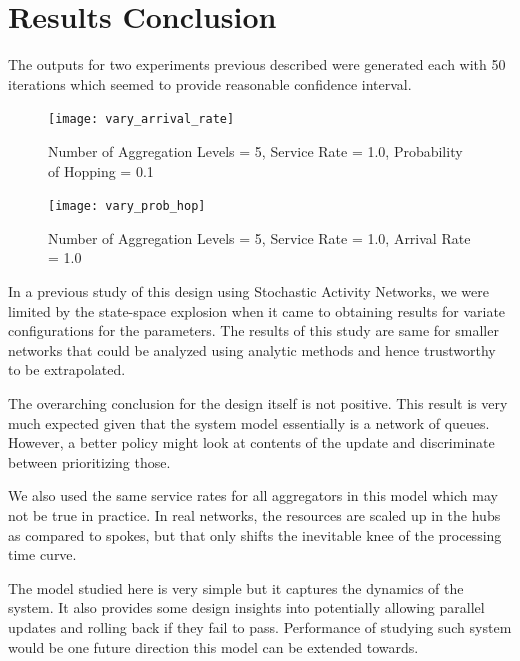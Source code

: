\documentclass[conference]{IEEEtran}
\begin{document}
\section{Results Conclusion}
The outputs for two experiments previous described were generated each with 50 iterations which seemed to provide reasonable confidence interval. 


 \begin{figure}[h]
 \centering
 \texttt{[image: vary\_arrival\_rate]}
 \caption{Number of Aggregation Levels = 5, Service Rate = 1.0, Probability of Hopping = 0.1 }
 \label{fig:vary_arrival_rate}
 \end{figure}

 \begin{figure}[h]
 \centering
 \texttt{[image: vary\_prob\_hop]}
 \caption{Number of Aggregation Levels = 5, Service Rate = 1.0, Arrival Rate = 1.0}
 \label{fig:vary_prob_hop}
 \end{figure}



In a previous study of this design using Stochastic Activity Networks, we were limited by the state-space explosion when it came to obtaining results for variate configurations for the parameters. The results of this study are same for smaller networks that could be analyzed using analytic methods and hence trustworthy to be extrapolated. 

The overarching conclusion for the design itself is not positive. This result is very much expected given that the system model essentially is a network of queues. However, a better policy might look at contents of the update and discriminate between prioritizing those. 

We also used the same service rates for all aggregators in this model which may not be true in practice. In real networks, the resources are scaled up in the hubs as compared to spokes, but that only shifts the inevitable knee of the processing time curve. 



The model studied here is very simple but it captures the dynamics of the system. It also provides some design insights into potentially allowing parallel updates and rolling back if they fail to pass. Performance of studying such system would be one future direction this model can be extended towards.
\end{document}
